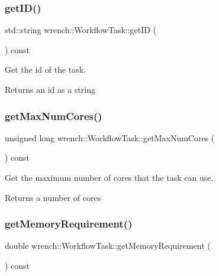 \subsubsection{\texorpdfstring{get\+I\+D()}{getID()}}
{\footnotesize\ttfamily std\+::string wrench\+::\+Workflow\+Task\+::get\+ID (\begin{DoxyParamCaption}{ }\end{DoxyParamCaption}) const}



Get the id of the task. 

\begin{DoxyReturn}{Returns}
an id as a string 
\end{DoxyReturn}
\mbox{\label{classwrench_1_1_workflow_task_aa470fe4c0a34211165989afabcba795f}} 
\subsubsection{\texorpdfstring{get\+Max\+Num\+Cores()}{getMaxNumCores()}}
{\footnotesize\ttfamily unsigned long wrench\+::\+Workflow\+Task\+::get\+Max\+Num\+Cores (\begin{DoxyParamCaption}{ }\end{DoxyParamCaption}) const}



Get the maximum number of cores that the task can use. 

\begin{DoxyReturn}{Returns}
a number of cores 
\end{DoxyReturn}
\mbox{\label{classwrench_1_1_workflow_task_aeafc6e6f0bce5853a3fd1e4818638908}} 
\subsubsection{\texorpdfstring{get\+Memory\+Requirement()}{getMemoryRequirement()}}
{\footnotesize\ttfamily double wrench\+::\+Workflow\+Task\+::get\+Memory\+Requirement (\begin{DoxyParamCaption}{ }\end{DoxyParamCaption}) const}



